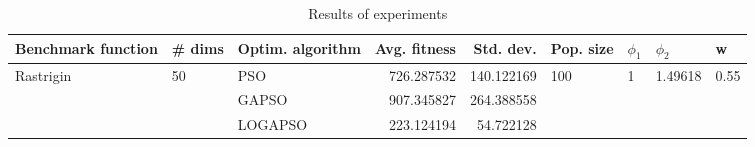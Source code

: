 \begin{table}
\centering
\caption{Results of experiments}
\begin{tabular}{lllrrllll}
\toprule
        Benchmark function &             \# dims & Optim. algorithm &  Avg. fitness &  Std. dev. &            Pop. size &         $\phi_{1}$ &               $\phi_{2}$ &                     w \\
\midrule
\multirow{3}{*}{Rastrigin} & \multirow{3}{*}{50} &              PSO &    726.287532 & 140.122169 & \multirow{3}{*}{100} & \multirow{3}{*}{1} & \multirow{3}{*}{1.49618} & \multirow{3}{*}{0.55} \\
                           &                     &            GAPSO &    907.345827 & 264.388558 &                      &                    &                          &                       \\
                           &                     &          LOGAPSO &    223.124194 &  54.722128 &                      &                    &                          &                       \\
\bottomrule
\end{tabular}
\end{table}
